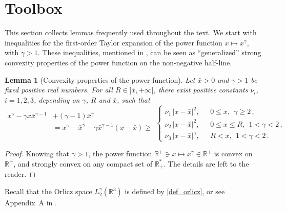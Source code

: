 \documentclass[11pt,reqno]{amsart}
\newtheorem{lemma}{Lemma}
\def \R{{\mathbb{R}}}
\begin{document}
\section{Toolbox}
\label{s:tools}
This section collects lemmas frequently used throughout the text. We start with  inequalities for the first-order Taylor expansion of the power function $x\mapsto x^\gamma$, with $\gamma>1$. These inequalities, mentioned in \cite{LM98}, can be seen as ``generalized'' strong convexity properties of the power function on the non-negative half-line.
\begin{lemma}[Convexity properties of the power function]
  \label{lem:convex}
  Let $\bar{x}>0$ and $\gamma >1$ be fixed positive real numbers. For all $ R \in ]\bar{x}, + \infty [ $, there exist positive constants $\nu_i$, $i=1,2,3$,
    depending on $\gamma$, $R$ and $\bar{x}$, such that
  \begin{equation*}
    \begin{aligned}
      x^\gamma  - \gamma x\bar{x}^{\gamma -1} &+ (\gamma-1)\bar{x}^\gamma \\
      & = x^\gamma -\bar{x}^\gamma - \gamma \bar{x}^{\gamma -1}(x-\bar{x}) \geq\\
     & 
    \end{aligned}  
    \left \{
    \begin{aligned}
      \nu_1 \, |x-\bar{x}|^2, & \ \ \ 0 \leq x , \ \  \gamma \geq 2\,, \\
      \nu_2 \, |x-\bar{x}|^2, & \ \ \  0\leq x \leq R,  \ \  1<\gamma < 2\,, \\
      \nu_3 \, |x-\bar{x}|^\gamma, & \ \  \ R < x , \ \   1<\gamma < 2\,.
    \end{aligned}  
    \right.
  \end{equation*}  
\end{lemma}
\begin{proof} Knowing that $\gamma>1$, the power function $\R^+ \ni x\mapsto x^\gamma \in \R^+$ is convex  on $\R^+$, and strongly convex on any compact set of $\R_+^* $. The details are left to the reader.
\end{proof}

Recall that the Orlicz space $L_2^\gamma(\R^3)$ is defined by \eqref{def_orlicz}, or see
Appendix~A in \cite{Lio98}.
\end{document}
